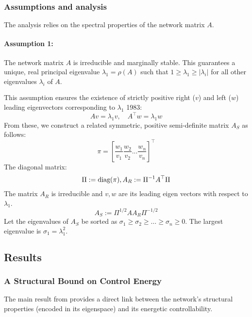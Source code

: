 \documentclass[10pt, a4paper]{article}
\begin{document}
\subsubsection{Assumptions and analysis}
The analysis relies on the spectral properties of the network matrix $A$.

\paragraph{Assumption 1:} \label{sec:assumpt1} The network matrix $A$ is irreducible and marginally stable. This guarantees a unique, real principal eigenvalue $\lambda_1 = \rho(A)$ such that $1 \ge \lambda_1 \ge |\lambda_i|$ for all other eigenvalues $\lambda_i$ of $A$.

This assumption ensures the existence of strictly positive right ($v$) and left ($w$) leading eigenvectors corresponding to $\lambda_1$ {1983}:
\begin{equation}
    Av = \lambda_1 v, \quad A^{\top}w = \lambda_1 w
    \label{eq:eigenvectors}
\end{equation}
From these, we construct a related symmetric, positive semi-definite matrix $A_S$ as follows:
\begin{equation}
    \pi= [\frac{w_1}{v_1}\frac{w_2}{v_2} ...\frac{w_n}{v_n}]^{\top}
\end{equation}
The diagonal matrix: \\
\begin{equation}
\Pi:= \text{diag}(\pi) \\
,A_R:= \Pi^{-1}A^{\top}\Pi \quad  \\
\end{equation}
The matrix $A_R$  is irreducible and $v,w$ are its leading eigen vectors with respect to $\lambda_1$.
\begin{equation}
A_S:= \Pi^{1/2} A A_R \Pi^{-1/2}
\end{equation}
Let the eigenvalues of $A_S$ be sorted as $\sigma_1 \ge \sigma_2 \ge \dots \ge \sigma_n \ge 0$. The largest eigenvalue is $\sigma_1 = \lambda_1^2$.
\subsection{Results}

\subsubsection{A Structural Bound on Control Energy}
The main result from provides a direct link between the network's structural properties (encoded in its eigenspace) and its energetic controllability.
\end{document}
